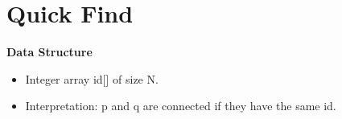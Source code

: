 \section{Quick Find}

\textbf{Data Structure}
\begin{itemize}
\item Integer array id[] of size N.
\item Interpretation: p and q are connected if they have the same id.
\end{itemize}







